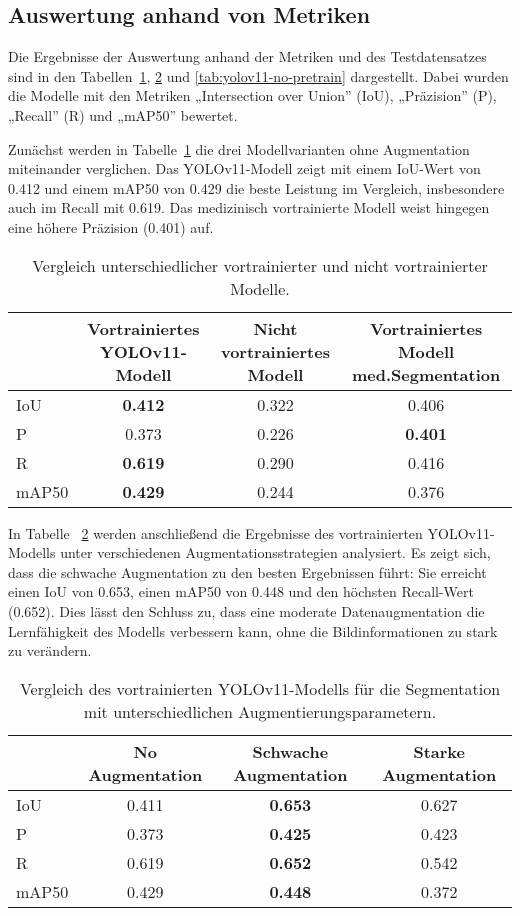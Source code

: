 \documentclass[
	german,
	accentcolor=10c,%
	type=intern,
	marginpar=false
	]{tudapub}
\begin{document}
\subsection{Auswertung anhand von Metriken}
Die Ergebnisse der Auswertung anhand der Metriken und des Testdatensatzes sind in den Tabellen~\ref{tab:modelle-metriken}, \ref{tab:yolov11-augmentation} und \ref{tab:yolov11-no-pretrain} dargestellt. Dabei wurden die Modelle mit den Metriken „Intersection over Union” (IoU), „Präzision” (P), „Recall” (R) und „mAP50” bewertet.

Zunächst werden in Tabelle~\ref{tab:modelle-metriken} die drei Modellvarianten ohne Augmentation miteinander verglichen. Das YOLOv11-Modell zeigt mit einem IoU-Wert von 0.412 und einem mAP50 von 0.429 die beste Leistung im Vergleich, insbesondere auch im Recall mit 0.619. Das medizinisch vortrainierte Modell weist hingegen eine höhere Präzision (0.401) auf.

\begin{table}[H]
\centering
\begin{tabular}{l|c|c|c}
\textbf{} & \textbf{Vortrainiertes YOLOv11-Modell} & \textbf{Nicht vortrainiertes Modell} & \textbf{Vortrainiertes Modell med.Segmentation} \\
\hline
IoU     & \textbf{0.412} & 0.322 & 0.406 \\
P       & 0.373 & 0.226 & \textbf{0.401} \\
R       & \textbf{0.619} & 0.290 & 0.416 \\
mAP50   & \textbf{0.429} & 0.244 & 0.376 \\
\end{tabular}
\caption{Vergleich unterschiedlicher vortrainierter und nicht vortrainierter Modelle.}
\label{tab:modelle-metriken}
\end{table}

In Tabelle ~\ref{tab:yolov11-augmentation} werden anschließend die Ergebnisse des vortrainierten YOLOv11-Modells unter verschiedenen Augmentationsstrategien analysiert. Es zeigt sich, dass die schwache Augmentation zu den besten Ergebnissen führt: Sie erreicht einen IoU von 0.653, einen mAP50 von 0.448 und den höchsten Recall-Wert (0.652). Dies lässt den Schluss zu, dass eine moderate Datenaugmentation die Lernfähigkeit des Modells verbessern kann, ohne die Bildinformationen zu stark zu verändern.

\begin{table}[H]
\centering
\begin{tabular}{l|c|c|c}
\textbf{} & \textbf{No Augmentation} & \textbf{Schwache Augmentation} & \textbf{Starke Augmentation} \\
\hline
IoU     & 0.411 & \textbf{0.653} & 0.627 \\
P       & 0.373 & \textbf{0.425} & 0.423 \\
R       & 0.619 & \textbf{0.652} & 0.542 \\
mAP50   & 0.429 & \textbf{0.448} & 0.372 \\
\end{tabular}
\caption{Vergleich des vortrainierten YOLOv11-Modells für die Segmentation mit unterschiedlichen Augmentierungsparametern.}
\label{tab:yolov11-augmentation}
\end{table}
\end{document}
